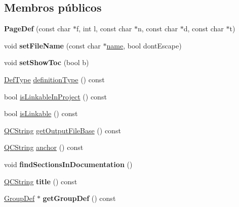 \subsection*{Membros públicos}
\begin{DoxyCompactItemize}
\item 
\hypertarget{class_page_def_ac113e37d2d30e275056fa4ce88bd6ee1}{{\bfseries Page\-Def} (const char $\ast$f, int l, const char $\ast$n, const char $\ast$d, const char $\ast$t)}\label{class_page_def_ac113e37d2d30e275056fa4ce88bd6ee1}

\item 
\hypertarget{class_page_def_ae8bae6a311daed0d93d92310dbffe4aa}{void {\bfseries set\-File\-Name} (const char $\ast$\hyperlink{class_definition_a2c310e06c9aadc6fb218f80fcbb5c695}{name}, bool dont\-Escape)}\label{class_page_def_ae8bae6a311daed0d93d92310dbffe4aa}

\item 
\hypertarget{class_page_def_a807f5495a3dd4bdea4d84cb690228904}{void {\bfseries set\-Show\-Toc} (bool b)}\label{class_page_def_a807f5495a3dd4bdea4d84cb690228904}

\item 
\hyperlink{class_definition_intf_a2dc566dfec40397b2990e6520536ecb5}{Def\-Type} \hyperlink{class_page_def_aac410235a8bf90e471e649bd9dbf9c5e}{definition\-Type} () const 
\item 
bool \hyperlink{class_page_def_a7ff00a84da6e47f3c64c6bf9f6316385}{is\-Linkable\-In\-Project} () const 
\item 
bool \hyperlink{class_page_def_afb5645c0dc69c2f1da67da6e33316e3b}{is\-Linkable} () const 
\item 
\hyperlink{class_q_c_string}{Q\-C\-String} \hyperlink{class_page_def_af72a982ba8198cd5c98e9fc850b71df6}{get\-Output\-File\-Base} () const 
\item 
\hyperlink{class_q_c_string}{Q\-C\-String} \hyperlink{class_page_def_acd17ae1d9600f864b1beb85dfb99a4f4}{anchor} () const 
\item 
\hypertarget{class_page_def_ad714b0e193e95efc23bb5de8dfb76cb6}{void {\bfseries find\-Sections\-In\-Documentation} ()}\label{class_page_def_ad714b0e193e95efc23bb5de8dfb76cb6}

\item 
\hypertarget{class_page_def_adf5241b59706e696c508de8baa4c2f97}{\hyperlink{class_q_c_string}{Q\-C\-String} {\bfseries title} () const }\label{class_page_def_adf5241b59706e696c508de8baa4c2f97}

\item 
\hypertarget{class_page_def_a55e586cb0de5d6be71e43e08c218790a}{\hyperlink{class_group_def}{Group\-Def} $\ast$ {\bfseries get\-Group\-Def} () const }\label{class_page_def_a55e586cb0de5d6be71e43e08c218790a}


\end{DoxyCompactItemize}
